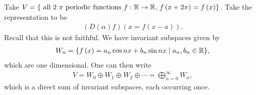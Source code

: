 \begin{example}
    Take $V = \{\text{~all 2 $\pi$ periodic functions $f : \mathbb{R} \to \mathbb{R}$, $f \left( x + 2\pi \right)  = f \left( x \right) $}\} $. Take the representation to be
    \begin{align}
        \left( D \left( \alpha \right) f \right) \left( x = f\left( x - a \right)  \right) 
    .\end{align}
    Recall that this is not faithful. We have invariant subspaces given by
    \begin{align}
        W_n = \{f \left( x \right) = a_n \cos n x + b_n \sin n x  \mid a_n, b_n \in \mathbb{R}\} 
    ,\end{align}
    which are one dimensional. One can then write
    \begin{align}
        V = W_0 \oplus W_1 \oplus W_2 \oplus \cdots = \bigoplus_{n=0}^{\infty} W_n
    ,\end{align}
    which is a direct sum of invariant subspaces, each occurring once.
\end{example}


